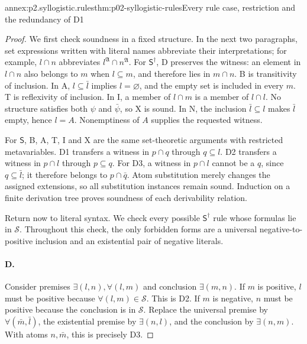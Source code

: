 \begin{annexitem}{annex:p2.syllogistic.rules}{thm:p02-syllogistic-rules}{Every rule case, restriction and the redundancy of D1}
\begin{proof}
We first check soundness in a fixed structure. In the next two paragraphs,
set expressions written with literal names abbreviate their interpretations;
for example, \(l\cap n\) abbreviates
\(l^{\mathfrak A}\cap n^{\mathfrak A}\).
For \(\mathsf S^\dagger\), D preserves the witness:
an element in \(l\cap n\) also belongs to \(m\) when \(l\subseteq m\),
and therefore lies in \(m\cap n\). B is transitivity of inclusion. In A,
\(l\subseteq\bar l\) implies \(l=\varnothing\), and the empty set is
included in every \(m\). T is reflexivity of inclusion. In I, a member of
\(l\cap m\) is a member of \(l\cap l\). No structure satisfies both
\(\psi\) and \(\bar\psi\), so X is sound. In N, the inclusion
\(\bar l\subseteq l\) makes \(\bar l\) empty, hence \(l=A\). Nonemptiness
of \(A\) supplies the requested witness.

For \(\mathsf S\), B, A, T, I and X are the same set-theoretic arguments
with restricted metavariables. D1 transfers a witness in \(p\cap q\)
through \(q\subseteq l\). D2 transfers a witness in \(p\cap l\)
through \(p\subseteq q\). For D3, a witness in \(p\cap l\) cannot be a
\(q\), since \(q\subseteq\bar l\); it therefore belongs to
\(p\cap\bar q\). Atom substitution merely changes the assigned extensions,
so all substitution instances remain sound. Induction on a finite derivation
tree proves soundness of each derivability relation.

Return now to literal syntax. We check every possible
\(\mathsf S^\dagger\) rule whose formulas lie
in \(\mathcal S\). Throughout this check, the only forbidden forms are a
universal negative-to-positive inclusion and an existential pair of negative
literals.

\paragraph{D.}
Consider premises \(\exists(l,n),\forall(l,m)\) and conclusion
\(\exists(m,n)\). If \(m\) is positive, \(l\) must be positive because
\(\forall(l,m)\in\mathcal S\). This is D2. If \(m\) is negative, \(n\)
must be positive because the conclusion is in \(\mathcal S\). Replace the
universal premise by \(\forall(\bar m,\bar l)\), the existential premise
by \(\exists(n,l)\), and the conclusion by \(\exists(n,m)\). With atoms
\(n,\bar m\), this is precisely D3.


\end{proof}
\end{annexitem}
